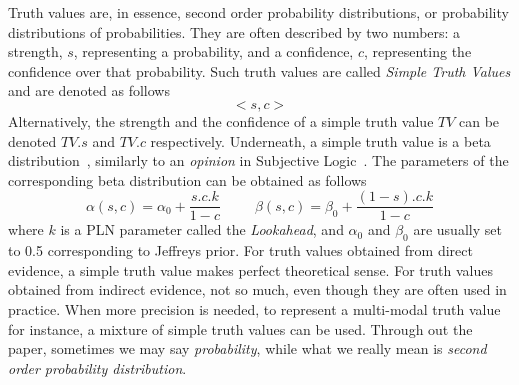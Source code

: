 \documentclass[runningheads]{llncs}
\newcommand{\TEval}{\textit{Evaluation}}
\newcommand{\TLamb}{\textit{Lambda}}
\newcommand{\TAnd}{\textit{And}}
\newcommand{\TOr}{\textit{Or}}
\newcommand{\TNot}{\textit{Not}}
\newcommand{\TImpl}{\textit{Implication}}
\newcommand{\TTV}{\textit{TV}}
\begin{document}
Truth values are, in essence, second order probability distributions,
or probability distributions of probabilities.  They are often
described by two numbers: a strength, $s$, representing a probability,
and a confidence, $c$, representing the confidence over that
probability.  Such truth values are called \emph{Simple Truth Values}
and are denoted as follows
$$<\!s, c\!>$$
Alternatively, the strength and the confidence of a simple truth value
$\TTV$ can be denoted $\TTV.s$ and $\TTV.c$ respectively.  Underneath,
a simple truth value is a beta distribution~\cite{Abourizk94Fitting},
similarly to an \emph{opinion} in Subjective Logic~\cite{Josang2026}.
The parameters of the corresponding beta distribution can be obtained
as follows
$$\alpha(s, c)=\alpha_0 + \frac{s.c.k}{1-c}\ \ \ \ \ \ \ \ \ \ \
\beta(s, c)=\beta_0 + \frac{(1-s).c.k}{1-c}$$ where $k$ is a PLN
parameter called the \emph{Lookahead}, and $\alpha_0$ and $\beta_0$
are usually set to 0.5 corresponding to Jeffreys prior.  For truth
values obtained from direct evidence, a simple truth value makes
perfect theoretical sense.  For truth values obtained from indirect
evidence, not so much, even though they are often used in practice.
When more precision is needed, to represent a multi-modal truth value
for instance, a mixture of simple truth values can be used.  Through
out the paper, sometimes we may say \emph{probability}, while what we
really mean is \emph{second order probability distribution}.


\end{document}

